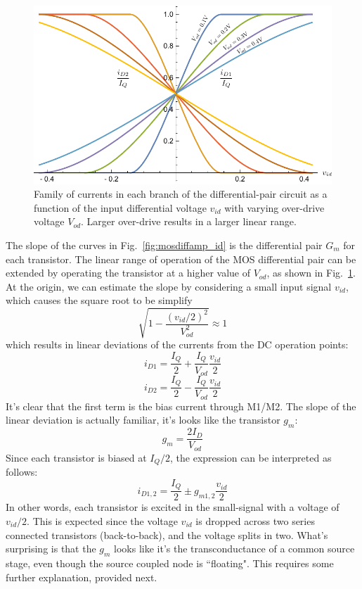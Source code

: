 \begin{figure}[tb]
\begin{center}
\includegraphics[width=.7\columnwidth]{mosdiffamp_id_od}
\end{center}
\caption{Family of currents in each branch of the differential-pair circuit as a function of the input differential voltage $v_{id}$ with varying over-drive voltage $V_{od}$.  Larger over-drive results in a larger linear range.} \label{fig:mosdiffamp_id_od}
\end{figure}

The slope of the curves in Fig.~\ref{fig:mosdiffamp_id} is the differential pair $G_m$ for each transistor.   The linear range of operation of the MOS differential pair can be extended by operating the transistor at a higher value of $V_{od}$, as shown in Fig.~\ref{fig:mosdiffamp_id_od}.   At the origin, we can estimate the slope by considering a small input signal $v_{id}$, which causes the square root to be simplify
%
\begin{equation} 
	\sqrt {1 - \frac{{{{({v_{id}}/2)}^2}}}{{V_{od}^2}}}  \approx 1
\end{equation}
%
which results in linear deviations of the currents from the DC operation points:
\begin{equation} 
	{i_{D1}} = \frac{I_Q}{2} + \frac{I_Q}{{{V_{od}}}}\frac{{{v_{id}}}}{2} 
\end{equation}
\begin{equation} 
	{i_{D2}} = \frac{I_Q}{2} - \frac{I_Q}{{{V_{od}}}}\frac{{{v_{id}}}}{2}
\end{equation}
%
It's clear that the first term is the bias current through M1/M2.  The slope of the linear deviation is actually familiar, it's looks like the transistor $g_m$:
%
\begin{equation}
	g_m = \frac{2 I_D}{V_{od}}
\end{equation}
%
Since each transistor is biased at $I_Q/2$, the expression can be interpreted as follows:
%
\begin{equation} 
	{i_{D1,2}} = \frac{I_Q}{2} \pm g_{m1,2} \frac{{{v_{id}}}}{2}
\end{equation}
%
In other words, each transistor is excited in the small-signal with a voltage of $v_{id}/2$.  This is expected since the voltage $v_{id}$ is dropped across two series connected transistors (back-to-back), and the voltage splits in two.  What's surprising is that the $g_m$ looks like it's the transconductance of a common source stage, even though the source coupled node is ``floating".  This requires some further explanation, provided next.


